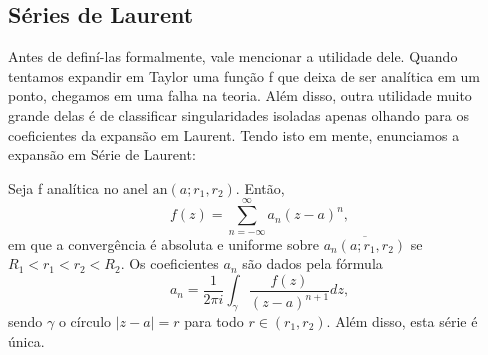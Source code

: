 \documentclass[complex.tex]{subfiles}
\begin{document}
\subsection{Séries de Laurent}
Antes de definí-las formalmente, vale mencionar a utilidade dele. Quando tentamos expandir em Taylor uma função f que
deixa de ser analítica em um ponto, chegamos em uma falha na teoria. Além disso, outra utilidade muito grande delas é de classificar singularidades
isoladas apenas olhando para os coeficientes da expansão em Laurent. Tendo isto em mente, enunciamos a expansão em Série de Laurent:
\hypertarget{laurent}{
	\begin{theorem*}
		Seja f analítica no anel \(\mathrm{an}(a; r_{1}, r_{2})\). Então,
		\[
			f(z) = \sum\limits_{n=-\infty}^{\infty}a_{n}(z-a)^{n},
		\]
		em que a convergência é absoluta e uniforme sobre \(\overline{a_{n}(a; r_{1}, r_{2})}\) se
		\(R_{1} < r_{1} < r_{2} < R_{2}.\) Os coeficientes \(a_{n}\) são dados pela fórmula
		\[
			a_{n} = \frac{1}{2\pi i}\int_{\gamma }^{}\frac{f(z)}{(z-a)^{n+1}}dz,
		\]
		sendo \(\gamma \) o círculo \(|z-a|=r\) para todo \(r\in (r_{1}, r_{2}).\) Além disso, esta série é única.
	\end{theorem*}}
\end{document}
